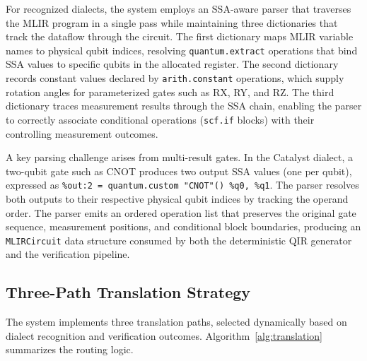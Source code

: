 \documentclass[conference]{IEEEtran}
\begin{document}
For recognized dialects, the system employs an SSA-aware parser that traverses the MLIR program in a single pass while maintaining three dictionaries that track the dataflow through the circuit. The first dictionary maps MLIR variable names to physical qubit indices, resolving \texttt{quantum.extract} operations that bind SSA values to specific qubits in the allocated register. The second dictionary records constant values declared by \texttt{arith.constant} operations, which supply rotation angles for parameterized gates such as RX, RY, and RZ. The third dictionary traces measurement results through the SSA chain, enabling the parser to correctly associate conditional operations (\texttt{scf.if} blocks) with their controlling measurement outcomes.

A key parsing challenge arises from multi-result gates. In the Catalyst dialect, a two-qubit gate such as CNOT produces two output SSA values (one per qubit), expressed as \texttt{\%out:2 = quantum.custom "CNOT"() \%q0, \%q1}. The parser resolves both outputs to their respective physical qubit indices by tracking the operand order. The parser emits an ordered operation list that preserves the original gate sequence, measurement positions, and conditional block boundaries, producing an \texttt{MLIRCircuit} data structure consumed by both the deterministic QIR generator and the verification pipeline.

\subsection{Three-Path Translation Strategy}\label{sec:translation}

The system implements three translation paths, selected dynamically based on dialect recognition and verification outcomes. Algorithm~\ref{alg:translation} summarizes the routing logic.
\end{document}
